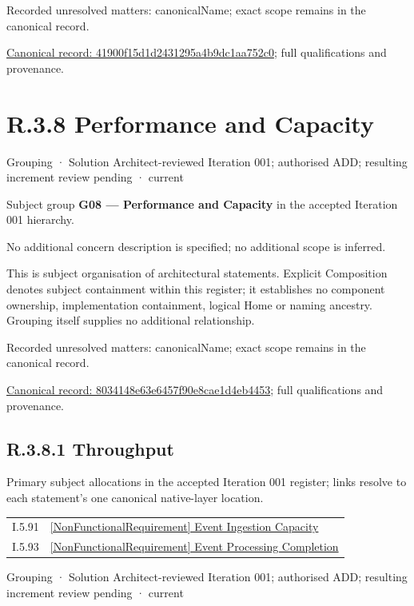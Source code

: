 {\small Recorded unresolved matters: canonicalName; exact scope remains in the canonical record.}\par
{\footnotesize \href{../../../../continuum/grouping/41900f15d1d2431295a4b9dc1aa752c0.md}{Canonical record: 41900f15d1d2431295a4b9dc1aa752c0}; full qualifications and provenance.}\par
\section*{R.3.8 Performance and Capacity}
\label{navigation:R.3.8}

\label{element:8034148e63e6457f90e8cae1d4eb4453}
{\small Grouping · Solution Architect-reviewed Iteration 001; authorised ADD; resulting increment review pending · current}\par

Subject group \textbf{G08 — Performance and Capacity} in the accepted Iteration 001 hierarchy.



No additional concern description is specified; no additional scope is inferred.



This is subject organisation of architectural statements. Explicit Composition denotes subject containment within this register; it establishes no component ownership, implementation containment, logical Home or naming ancestry. Grouping itself supplies no additional relationship.


{\small Recorded unresolved matters: canonicalName; exact scope remains in the canonical record.}\par
{\footnotesize \href{../../../../continuum/grouping/8034148e63e6457f90e8cae1d4eb4453.md}{Canonical record: 8034148e63e6457f90e8cae1d4eb4453}; full qualifications and provenance.}\par
\subsection*{R.3.8.1 Throughput}
\label{navigation:R.3.8.1}

Primary subject allocations in the accepted Iteration 001 register; links resolve to each statement’s one canonical native-layer location.\par
\begin{longtable}{p{.22\linewidth}p{.73\linewidth}}
I.5.91 & \hyperref[element:75420022c1a7463e91ca48f229a78194]{[NonFunctionalRequirement] Event Ingestion Capacity} \\
I.5.93 & \hyperref[element:d1380eec700a492b810354e0798c8146]{[NonFunctionalRequirement] Event Processing Completion} \\
\end{longtable}
\label{element:cdcfbe8d106844109bb8ded51dea7a8a}
{\small Grouping · Solution Architect-reviewed Iteration 001; authorised ADD; resulting increment review pending · current}\par

